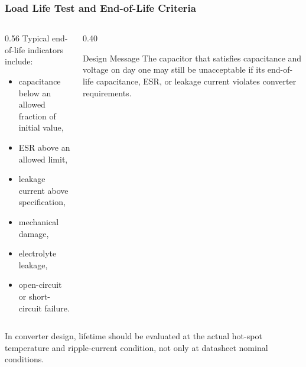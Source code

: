 \begin{frame}
\frametitle{Load Life Test and End-of-Life Criteria}
\begin{columns}
\begin{column}{0.56\textwidth}
Typical end-of-life indicators include:
\begin{itemize}
    \item capacitance below an allowed fraction of initial value,
    \item ESR above an allowed limit,
    \item leakage current above specification,
    \item mechanical damage,
    \item electrolyte leakage,
    \item open-circuit or short-circuit failure.
\end{itemize}
\end{column}

\begin{column}{0.40\textwidth}
\begin{block}{Design Message}
\small
The capacitor that satisfies capacitance and voltage on day one may still be unacceptable if its end-of-life capacitance, ESR, or leakage current violates converter requirements.
\end{block}
\end{column}
\end{columns}
In converter design, lifetime should be evaluated at the actual hot-spot temperature and ripple-current condition, not only at datasheet nominal conditions.
\end{frame}

